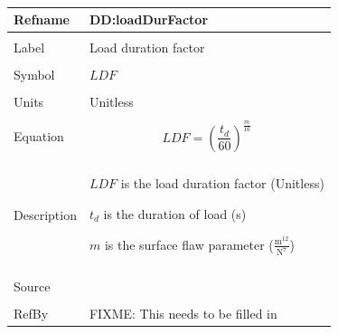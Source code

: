 \documentclass[12pt]{article}
\begin{document}
~\newline
\noindent \begin{minipage}{\textwidth}
\begin{tabular}{p{} p{}}
\toprule \textbf{Refname} & \textbf{DD:loadDurFactor}
\label{DD:loadDurFactor}
\\ \midrule \\
Label & Load duration factor
\\ \midrule \\
Symbol & $LDF$
\\ \midrule \\
Units & Unitless
\\ \midrule \\
Equation & \begin{dmath}
           LDF=\left(\frac{{t_{d}}}{60}\right)^{\frac{m}{16}}
           \end{dmath}
\\ \midrule \\
Description & \begin{symbDescription}
              \item{$LDF$ is the load duration factor (Unitless)}
              \item{${t_{d}}$ is the duration of load (s)}
              \item{$m$ is the surface flaw parameter ($\frac{\text{m}^{12}}{\text{N}^{7}}$)}
              \end{symbDescription}
\\ \midrule \\
Source & 
\\ \midrule \\
RefBy & FIXME: This needs to be filled in
\\ \bottomrule \end{tabular}
\end{minipage}\\
~\newline
\end{document}
